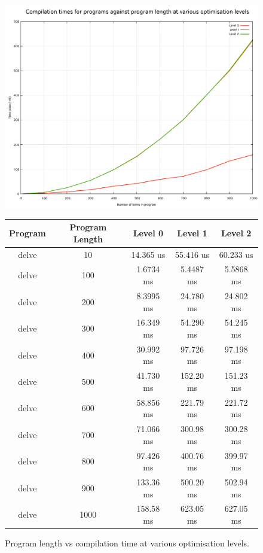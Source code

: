 \begin{figure}[H]
    \centering
    \includegraphics[width=\textwidth - 100pt]{04_results/images/compilation_results}

    \begin{center}
    \begin{tabular}{ |c|c|c|c|c| } 
    \hline
    Program & Program Length & Level 0 & Level 1 & Level 2 \\ 
    \hline
    delve & 10 & 14.365 us & 55.416 us & 60.233 us\\
    \hline
    delve & 100 & 1.6734 ms & 5.4487 ms & 5.5868 ms\\
    \hline
    delve & 200 & 8.3995 ms & 24.780 ms & 24.802 ms\\
    \hline
    delve & 300 & 16.349 ms	& 54.290 ms& 54.245 ms\\
    \hline
    delve & 400 & 30.992 ms & 97.726 ms & 	97.198 ms\\
    \hline
    delve & 500 & 41.730 ms &152.20 ms & 151.23 ms \\
    \hline
    delve & 600 & 58.856 ms &221.79 ms & 221.72 ms \\
    \hline
    delve & 700 & 71.066 ms &300.98 ms & 300.28 ms \\
    \hline
    delve & 800 & 97.426 ms &400.76 ms & 399.97 ms \\
    \hline
    delve & 900 & 133.36 ms &500.20 ms & 502.94 ms \\
    \hline
    delve & 1000 & 158.58 ms & 623.05 ms & 627.05 ms \\
    \hline
    \end{tabular}
    \end{center}
    \caption{Program length vs compilation time at various optimisation levels.}
    \label{fig:compilation_results}
\end{figure}
